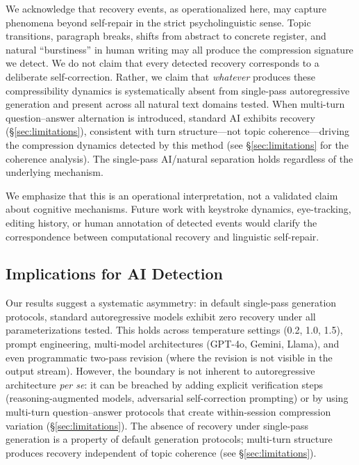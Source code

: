 \documentclass[final]{clv2025}
\begin{document}
We acknowledge that recovery events, as operationalized here, may capture phenomena beyond self-repair in the strict psycholinguistic sense. Topic transitions, paragraph breaks, shifts from abstract to concrete register, and natural ``burstiness'' in human writing may all produce the compression signature we detect. We do not claim that every detected recovery corresponds to a deliberate self-correction. Rather, we claim that \textit{whatever} produces these compressibility dynamics is systematically absent from single-pass autoregressive generation and present across all natural text domains tested. When multi-turn question--answer alternation is introduced, standard AI exhibits recovery (\S\ref{sec:limitations}), consistent with turn structure---not topic coherence---driving the compression dynamics detected by this method (see \S\ref{sec:limitations} for the coherence analysis). The single-pass AI/natural separation holds regardless of the underlying mechanism.

We emphasize that this is an operational interpretation, not a validated claim about cognitive mechanisms. Future work with keystroke dynamics, eye-tracking, editing history, or human annotation of detected events would clarify the correspondence between computational recovery and linguistic self-repair.

\subsection{Implications for AI Detection}

Our results suggest a systematic asymmetry: in default single-pass generation protocols, standard autoregressive models exhibit zero recovery under all parameterizations tested. This holds across temperature settings (0.2, 1.0, 1.5), prompt engineering, multi-model architectures (GPT-4o, Gemini, Llama), and even programmatic two-pass revision (where the revision is not visible in the output stream). However, the boundary is not inherent to autoregressive architecture \textit{per se}: it can be breached by adding explicit verification steps (reasoning-augmented models, adversarial self-correction prompting) or by using multi-turn question--answer protocols that create within-session compression variation (\S\ref{sec:limitations}). The absence of recovery under single-pass generation is a property of default generation protocols; multi-turn structure produces recovery independent of topic coherence (see \S\ref{sec:limitations}).
\end{document}
